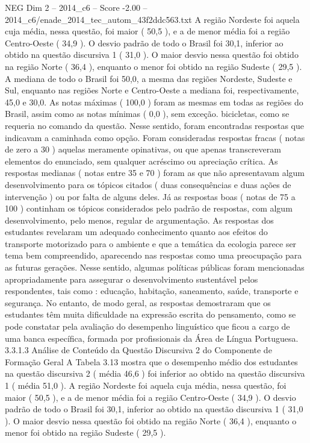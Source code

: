 \begin{textsample}{NEG Dim 2 – 2014\_c6 – Score -2.00 – 2014\_c6/enade\_2014\_tec\_autom\_43f2ddc563.txt}
A região Nordeste foi aquela cuja média, nessa questão, foi maior ( 50,5 ), e a de menor média foi a região Centro-Oeste ( 34,9 ).
O desvio padrão de todo o Brasil foi 30,1, inferior ao obtido na questão discursiva 1 ( 31,0 ).
O maior desvio nessa questão foi obtido na região Norte ( 36,4 ), enquanto o menor foi obtido na região Sudeste ( 29,5 ).
A mediana de todo o Brasil foi 50,0, a mesma das regiões Nordeste, Sudeste e Sul, enquanto nas regiões Norte e Centro-Oeste a mediana foi, respectivamente, 45,0 e 30,0.
As notas máximas ( 100,0 ) foram as mesmas em todas as regiões do Brasil, assim como as notas mínimas ( 0,0 ), sem exceção. bicicletas, como se requeria no comando da questão.
Nesse sentido, foram encontradas respostas que indicavam a caminhada como opção.
Foram consideradas respostas fracas ( notas de zero a 30 ) aquelas meramente opinativas, ou que apenas transcreveram elementos do enunciado, sem qualquer acréscimo ou apreciação crítica.
As respostas medianas ( notas entre 35 e 70 ) foram as que não apresentavam algum desenvolvimento para os tópicos citados ( duas consequências e duas ações de intervenção ) ou por falta de alguns deles.
Já as respostas boas ( notas de 75 a 100 ) continham os tópicos considerados pelo padrão de respostas, com algum desenvolvimento, pelo menos, regular de argumentação.
As respostas dos estudantes revelaram um adequado conhecimento quanto aos efeitos do transporte motorizado para o ambiente e que a temática da ecologia parece ser tema bem compreendido, aparecendo nas respostas como uma preocupação para as futuras gerações.
Nesse sentido, algumas políticas públicas foram mencionadas apropriadamente para assegurar o desenvolvimento sustentável pelos respondentes, tais como : educação, habitação, saneamento, saúde, transporte e segurança.
No entanto, de modo geral, as respostas demostraram que os estudantes têm muita dificuldade na expressão escrita do pensamento, como se pode constatar pela avaliação do desempenho linguístico que ficou a cargo de uma banca específica, formada por profissionais da Área de Língua Portuguesa. 3.3.1.3 Análise de Conteúdo da Questão Discursiva 2 do Componente de Formação Geral A Tabela 3.13 mostra que o desempenho médio dos estudantes na questão discursiva 2 ( média 46,6 ) foi inferior ao obtido na questão discursiva 1 ( média 51,0 ).
A região Nordeste foi aquela cuja média, nessa questão, foi maior ( 50,5 ), e a de menor média foi a região Centro-Oeste ( 34,9 ).
O desvio padrão de todo o Brasil foi 30,1, inferior ao obtido na questão discursiva 1 ( 31,0 ).
O maior desvio nessa questão foi obtido na região Norte ( 36,4 ), enquanto o menor foi obtido na região Sudeste ( 29,5 ).

\end{textsample}
